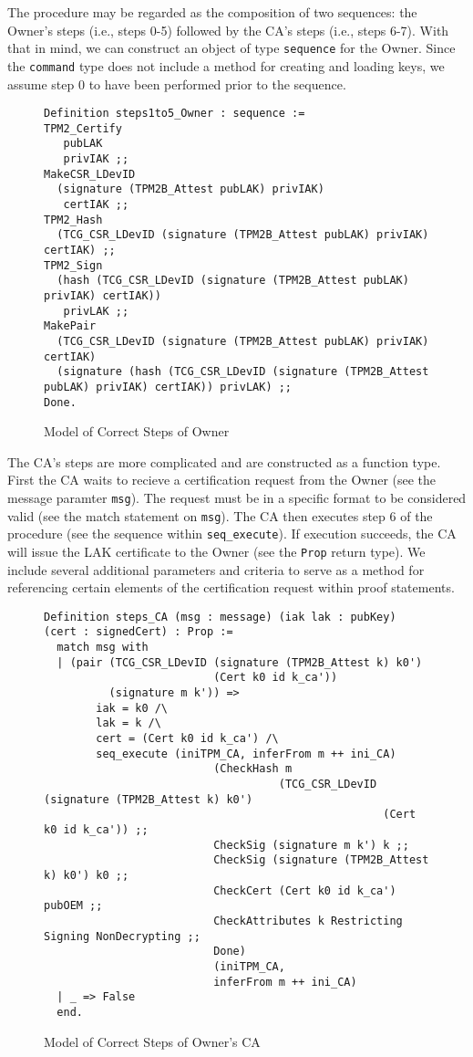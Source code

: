  The procedure may be regarded as the composition of two sequences: the Owner's steps (i.e., steps 0-5) followed by the CA's steps (i.e., steps 6-7). With that in mind, we can construct an object of type \verb|sequence| for the Owner. Since the \verb|command| type does not include a method for creating and loading keys, we assume step 0 to have been performed prior to the sequence. 
\begin{figure}[h]
\begin{lstlisting}[language=Coq]
Definition steps1to5_Owner : sequence :=
TPM2_Certify 
   pubLAK 
   privIAK ;;
MakeCSR_LDevID 
  (signature (TPM2B_Attest pubLAK) privIAK) 
   certIAK ;;
TPM2_Hash 
  (TCG_CSR_LDevID (signature (TPM2B_Attest pubLAK) privIAK) certIAK) ;;
TPM2_Sign 
  (hash (TCG_CSR_LDevID (signature (TPM2B_Attest pubLAK) privIAK) certIAK)) 
   privLAK ;;
MakePair 
  (TCG_CSR_LDevID (signature (TPM2B_Attest pubLAK) privIAK) certIAK) 
  (signature (hash (TCG_CSR_LDevID (signature (TPM2B_Attest pubLAK) privIAK) certIAK)) privLAK) ;;
Done. 
\end{lstlisting}
\caption{Model of Correct Steps of Owner}
\end{figure}
The CA's steps are more complicated and are constructed as a function type. First the CA waits to recieve a certification request from the Owner (see the message paramter \verb|msg|). The request must be in a specific format to be considered valid (see the match statement on \verb|msg|). The CA then executes step 6 of the procedure (see the sequence within \verb|seq_execute|). If execution succeeds, the CA will issue the LAK certificate to the Owner (see the \verb|Prop| return type). We include several additional parameters and criteria to serve as a method for referencing certain elements of the certification request within proof statements.
\begin{figure}[h]
\begin{lstlisting}[language=Coq]
Definition steps_CA (msg : message) (iak lak : pubKey) (cert : signedCert) : Prop :=
  match msg with
  | (pair (TCG_CSR_LDevID (signature (TPM2B_Attest k) k0') 
                          (Cert k0 id k_ca'))
          (signature m k')) =>
        iak = k0 /\
        lak = k /\
        cert = (Cert k0 id k_ca') /\
        seq_execute (iniTPM_CA, inferFrom m ++ ini_CA)
                          (CheckHash m
                                    (TCG_CSR_LDevID (signature (TPM2B_Attest k) k0') 
                                                    (Cert k0 id k_ca')) ;;
                          CheckSig (signature m k') k ;;
                          CheckSig (signature (TPM2B_Attest k) k0') k0 ;;
                          CheckCert (Cert k0 id k_ca') pubOEM ;;
                          CheckAttributes k Restricting Signing NonDecrypting ;;
                          Done)
                          (iniTPM_CA, 
                          inferFrom m ++ ini_CA)
  | _ => False
  end.
\end{lstlisting}
\caption{Model of Correct Steps of Owner's CA}
\end{figure}


